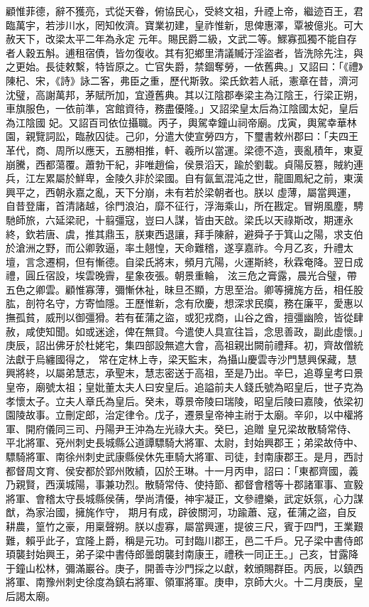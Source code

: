 \begin{pinyinscope}
 顧惟菲德，辭不獲亮，式從天眷，俯協民心，受終文祖，升禋上帝，繼迹百王，君臨萬宇，若涉川水，罔知攸濟。寶業初建，皇祚惟新，思俾惠澤，覃被億兆。可大赦天下，改梁太平二年為永定
 元年。賜民爵二級，文武二等。鰥寡孤獨不能自存者人穀五斛。逋租宿債，皆勿復收。其有犯鄉里清議贓汙淫盜者，皆洗除先注，與之更始。長徒敕繫，特皆原之。亡官失爵，禁錮奪勞，一依舊典。」又詔曰：「《禮》陳杞、宋，《詩》詠二客，弗臣之重，歷代斯敦。梁氏欽若人祇，憲章在昔，濟河沈璧，高謝萬邦，茅賦所加，宜遵舊典。其以江陰郡奉梁主為江陰王，行梁正朔，車旗服色，一依前準，宮館資待，務盡優隆。」又詔梁皇太后為江陰國太妃，皇后為江陰國
 妃。又詔百司依位攝職。丙子，輿駕幸鐘山祠帝廟。戊寅，輿駕幸華林園，親覽詞訟，臨赦囚徒。己卯，分遣大使宣勞四方，下璽書敕州郡曰：「夫四王革代，商、周所以應天，五勝相推，軒、羲所以當運。梁德不造，喪亂積年，東夏崩騰，西都蕩覆。蕭勃干紀，非唯趙倫，侯景滔天，踰於劉載。貞陽反篡，賊約連兵，江左累屬於鮮卑，金陵久非於梁國。自有氤氳混沌之世，龍圖鳳紀之前，東漢興平之，西朝永嘉之亂，天下分崩，未有若於梁朝者也。朕以
 虛薄，屬當興運，自昔登庸，首清諸越，徐門浪泊，靡不征行，浮海乘山，所在戡定。冒朔風塵，騁馳師旅，六延梁祀，十翦彊寇，豈曰人謀，皆由天啟。梁氏以天祿斯改，期運永終，欽若唐、虞，推其鼎玉，朕東西退讓，拜手陳辭，避舜子于箕山之陽，求支伯於滄洲之野，而公卿敦逼，率土翹惶，天命難稽，遂享嘉祚。今月乙亥，升禮太壇，言念遷桐，但有慚德。自梁氏將末，頻月亢陽，火運斯終，秋霖奄降。翌日成禮，圓丘宿設，埃雲晚霽，星象夜張。朝景重輪，
 泫三危之膏露，晨光合璧，帶五色之卿雲。顧惟寡薄，彌慚休祉，昧旦丕顯，方思至治。卿等擁旄方岳，相任股肱，剖符名守，方寄恤隱。王歷惟新，念有欣慶，想深求民瘼，務在廉平，愛惠以撫孤貧，威刑以御彊猾。若有萑蒲之盜，或犯戎商，山谷之酋，擅彊幽險，皆從肆赦，咸使知聞。如或迷途，俾在無貸。今遣使人具宣往旨，念思善政，副此虛懷。」庚辰，詔出佛牙於杜姥宅，集四部設無遮大會，高祖親出闕前禮拜。初，齊故僧統法獻于烏纏國得之，
 常在定林上寺，梁天監末，為攝山慶雲寺沙門慧興保藏，慧興將終，以屬弟慧志，承聖末，慧志密送于高祖，至是乃出。辛巳，追尊皇考曰景皇帝，廟號太祖；皇妣董太夫人曰安皇后。追謚前夫人錢氏號為昭皇后，世子克為孝懷太子。立夫人章氏為皇后。癸未，尊景帝陵曰瑞陵，昭皇后陵曰嘉陵，依梁初園陵故事。立刪定郎，治定律令。戊子，遷景皇帝神主祔于太廟。辛卯，以中權將軍、開府儀同三司、丹陽尹王沖為左光祿大夫。癸巳，追贈
 皇兄梁故散騎常侍、平北將軍、兗州刺史長城縣公道譚驃騎大將軍、太尉，封始興郡王；弟梁故侍中、驃騎將軍、南徐州刺史武康縣侯休先車騎大將軍、司徒，封南康郡王。是月，西討都督周文育、侯安都於郢州敗績，囚於王琳。十一月丙申，詔曰：「東都齊國，義乃親賢，西漢城陽，事兼功烈。散騎常侍、使持節、都督會稽等十郡諸軍事、宣毅將軍、會稽太守長城縣侯蒨，學尚清優，神宇凝正，文參禮樂，武定妖氛，心力謀猷，為家治國，擁旄作守，
 期月有成，辟彼關河，功踰蕭、寇，萑蒲之盜，自反耕農，篁竹之豪，用稟聲朔。朕以虛寡，屬當興運，提彼三尺，賓于四門，王業艱難，賴乎此子，宜隆上爵，稱是元功。可封臨川郡王，邑二千戶。兄子梁中書侍郎頊襲封始興王，弟子梁中書侍郎曇朗襲封南康王，禮秩一同正王。」己亥，甘露降于鐘山松林，彌滿巖谷。庚子，開善寺沙門採之以獻，敕頒賜群臣。丙辰，以鎮西將軍、南豫州刺史徐度為鎮右將軍、領軍將軍。庚申，京師大火。十二月庚辰，皇
 后謁太廟。




\end{pinyinscope}
